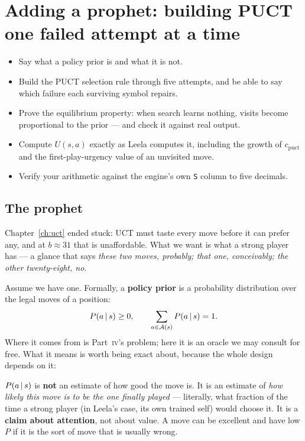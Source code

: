 \chapter{Adding a prophet: building PUCT one failed attempt at a time}
\label{ch:puct}

\begin{objectives}
\begin{itemize}
\item Say what a policy prior is and what it is not.
\item Build the PUCT selection rule through five attempts, and be able to say which failure
  each surviving symbol repairs.
\item Prove the equilibrium property: when search learns nothing, visits become proportional
  to the prior --- and check it against real output.
\item Compute $U(s,a)$ exactly as Leela computes it, including the growth of $c_{\text{puct}}$
  and the first-play-urgency value of an unvisited move.
\item Verify your arithmetic against the engine's own \texttt{S} column to five decimals.
\end{itemize}
\end{objectives}

\section{The prophet}

Chapter~\ref{ch:uct} ended stuck: UCT must taste every move before it can prefer any, and at
$b\approx31$ that is unaffordable. What we want is what a strong player has --- a glance that
says \emph{these two moves, probably; that one, conceivably; the other twenty-eight, no}.

Assume we have one. Formally, a \textbf{policy prior} is a probability distribution over the
legal moves of a position:
\[
  P(a \,|\, s) \ge 0, \qquad \sum_{a \in \mathcal{A}(s)} P(a\,|\, s) = 1 .
\]
Where it comes from is Part~\textsc{iv}'s problem; here it is an oracle we may consult for
free. What it means is worth being exact about, because the whole design depends on it:

\begin{keyidea}
$P(a\,|\, s)$ is \textbf{not} an estimate of how good the move is. It is an estimate of
\emph{how likely this move is to be the one finally played} --- literally, what fraction of
the time a strong player (in Leela's case, its own trained self) would choose it. It is a
\textbf{claim about attention}, not about value. A move can be excellent and have low $P$ if
it is the sort of move that is usually wrong.
\end{keyidea}

